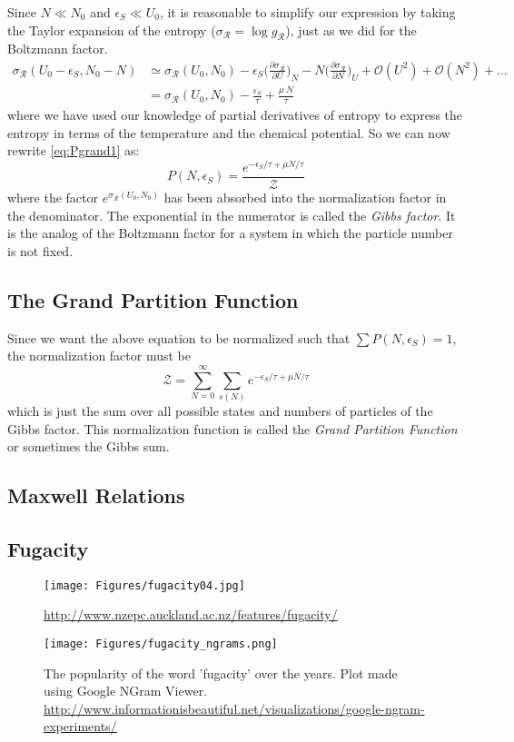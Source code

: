 Since $N \ll N_0$ and $\epsilon_S \ll U_0$, it is reasonable to simplify our expression by taking the Taylor expansion of the 
entropy ($\sigma_{\mathcal{R}} = \log{g_{\mathcal{R}}}$), just as we did for the Boltzmann factor.
\begin{align}
\sigma_{\mathcal{R}}(U_0-\epsilon_S, N_0-N) &\simeq 
\sigma_{\mathcal{R}}(U_0, N_0)
-\epsilon_S \bigg(\frac{\partial \sigma_{\mathcal{R}}}{\partial U}\bigg)_N
-N \bigg(\frac{\partial \sigma_{\mathcal{R}}}{\partial N}\bigg)_U
+ \mathcal{O}(U^2) + \mathcal{O}(N^2) +... \\
       &= \sigma_{\mathcal{R}}(U_0, N_0) - \frac{\epsilon_S}{\tau} + 
       \frac{\mu~N}{\tau}
\end{align}
where we have used our knowledge of partial derivatives of entropy to express the entropy in terms of the temperature and the chemical potential. So we can now rewrite \cref{eq:Pgrand1} as:
\begin{equation}
P(N,\epsilon_S) = 
\frac{e^{-\epsilon_{S}/\tau + \mu N/\tau}}{\mathscr{Z}}
\end{equation}
where the factor $e^{\sigma_{\mathcal{R}}(U_0, N_0)}$ has been absorbed into the normalization factor in the denominator. The exponential in the numerator
is called the \emph{Gibbs factor}. It is the analog of the Boltzmann factor for a system in which the particle number is not fixed.

\subsection{The Grand Partition Function}
Since we want the above equation to be normalized such that 
$\sum P(N,\epsilon_S) = 1$, the normalization factor must be
\begin{equation}
\mathscr{Z} = \sum_{N=0}^{\infty} \sum_{s(N)} e^{-\epsilon_{S}/\tau + \mu N/\tau}
\end{equation}
which is just the sum over all possible states and numbers of particles of the Gibbs factor. This normalization function is called the 
\emph{Grand Partition Function} or sometimes the Gibbs sum.


\subsection{Maxwell Relations}
\label{s:MaxwellRelations}





\subsection{Fugacity}
\label{s:Fugacity}
\begin{figure}[h]
\centering
\texttt{[image: Figures/fugacity04.jpg]}
\caption{\url{http://www.nzepc.auckland.ac.nz/features/fugacity/}}
\end{figure}



\begin{figure}[h]
\centering
\texttt{[image: Figures/fugacity\_ngrams.png]}
\caption{The popularity of the word 'fugacity' over the years. Plot made using Google NGram Viewer. \url{http://www.informationisbeautiful.net/visualizations/google-ngram-experiments/}}
\end{figure}